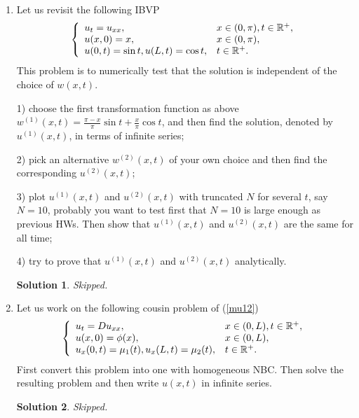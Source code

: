 \documentclass[6pt]{article}
\newtheorem{solution}{Solution}
\numberwithin{equation}{section}
\def\mathbb{\Bbb}
\begin{document}
\begin{enumerate}
\item  Let us revisit the following IBVP
\begin{equation}
\left\{
\begin{array}{ll}
u_t=u_{xx},& x\in(0,\pi),t\in\mathbb R^+,\\
u(x,0)=x,&x\in(0,\pi),\\
u(0,t)=\sin t, u(L,t)=\cos t, &t\in\mathbb R^+.
\end{array}
\right.
\end{equation}
This problem is to numerically test that the solution is independent of the choice of $w(x,t)$.

1) choose the first transformation function as above $w^{(1)}(x,t)=\frac{\pi-x}{\pi}\sin t+\frac{x}{\pi}\cos t$, and then find the solution, denoted by $u^{(1)}(x,t)$, in terms of infinite series;

2) pick an alternative $w^{(2)}(x,t)$ of your own choice and then find the corresponding $u^{(2)}(x,t)$;

3) plot $u^{(1)}(x,t)$ and $u^{(2)}(x,t)$ with truncated $N$ for several $t$, say $N=10$, probably you want to test first that $N=10$ is large enough as previous HWs.  Then show that $u^{(1)}(x,t)$ and $u^{(2)}(x,t)$ are the same for all time;

4) try to prove that $u^{(1)}(x,t)$ and $u^{(2)}(x,t)$ analytically.

\begin{solution}
Skipped.
\end{solution}

\item Let us work on the following cousin problem of (\ref{mu12})
\begin{equation}
\left\{
\begin{array}{ll}
u_t=Du_{xx},& x\in(0,L),t\in\mathbb R^+,\\
u(x,0)=\phi(x),&x\in(0,L),\\
u_x(0,t)=\mu_1(t), u_x(L,t)=\mu_2(t), &t\in\mathbb R^+.
\end{array}
\right.
\end{equation}
First convert this problem into one with homogeneous NBC.  Then solve the resulting problem and then write $u(x,t)$ in infinite series.
\begin{solution}
Skipped.
\end{solution}


\end{enumerate}
\end{document}
